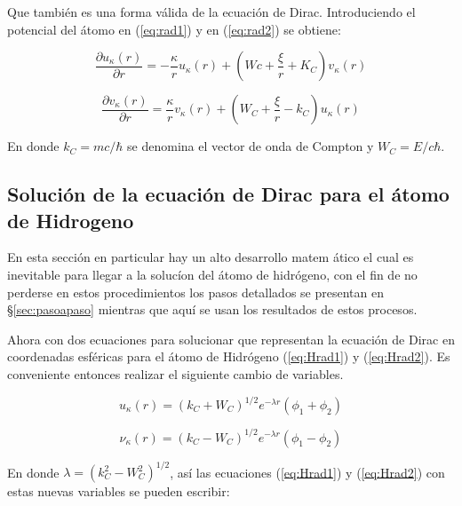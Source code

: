 \documentclass[a4paper, 12pt]{article} %
\begin{document}
Que tambi\'en es una forma v\'alida de la ecuaci\'on de Dirac. Introduciendo 
el potencial del \'atomo en (\ref{eq:rad1}) y en (\ref{eq:rad2}) se 
obtiene:

\begin{equation}\label{eq:Hrad1}
\dfrac{\partial u_{\kappa}(r)}{\partial r} =-\dfrac{\kappa}{r}u_{\kappa}(r)+\left ( Wc+\dfrac{\xi}{r}+K_C \right ) v_{\kappa}(r)
\end{equation}

\begin{equation}\label{eq:Hrad2}
\dfrac{\partial v_{\kappa}(r)}{\partial r} =\dfrac{\kappa}{r}v_{\kappa}(r)+
\left ( W_C + \dfrac{\xi}{r} - k_C \right )u_{\kappa}(r)
\end{equation}

En donde $k_C = mc/\hbar$ se denomina el vector de onda de Compton y 
$W_C = E / c\hbar$.


\subsection{Soluci\'on de la ecuaci\'on de Dirac para el 
\'atomo de Hidrogeno}\label{sec:solucion} 

En esta secci\'on en particular hay un alto desarrollo matem \'atico 
el cual es inevitable para llegar a la soluc\'ion del \'atomo 
de hidr\'ogeno, con el fin de no perderse en estos procedimientos
los pasos detallados se presentan en \S \ref{sec:pasoapaso} mientras
que aqu\'i se usan los resultados de estos procesos.
 
Ahora con dos ecuaciones para solucionar que representan  la ecuaci\'on 
de Dirac en coordenadas esf\'ericas para el \'atomo de Hidr\'ogeno
(\ref{eq:Hrad1}) y (\ref{eq:Hrad2}). Es conveniente entonces 
realizar el siguiente cambio de variables.

\begin{equation}\label{eq:cdv}
u_{\kappa}(r) = (k_C + W_C)^{1/2} e^{-\lambda r}(\phi_1 + \phi_2)
\end{equation}

\begin{equation}
\nu_{\kappa}(r) = (k_C - W_C )^{1/2} e^{-\lambda r} (\phi_1 - \phi_2)
\end{equation}

En donde $\lambda = (k_C^2 - W_C^2)^{1/2}$, as\'i las ecuaciones 
(\ref{eq:Hrad1}) y (\ref{eq:Hrad2}) con estas nuevas variables 
se pueden escribir:
\end{document}
